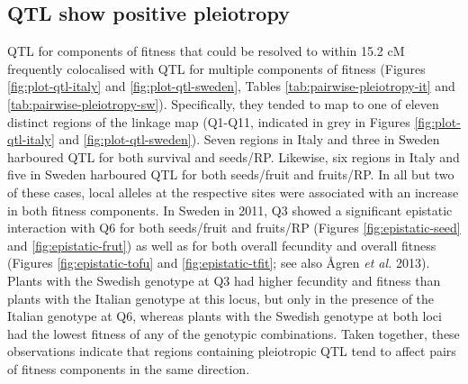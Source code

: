 \documentclass[]{article}
\begin{document}
\hypertarget{qtl-show-positive-pleiotropy}{%
\subsection{QTL show positive pleiotropy}\label{qtl-show-positive-pleiotropy}}

QTL for components of fitness that could be resolved to within 15.2 cM frequently colocalised with QTL for multiple components of fitness (Figures \ref{fig:plot-qtl-italy} and \ref{fig:plot-qtl-sweden}, Tables \ref{tab:pairwise-pleiotropy-it} and \ref{tab:pairwise-pleiotropy-sw}). Specifically, they tended to map to one of eleven distinct regions of the linkage map (Q1-Q11, indicated in grey in Figures \ref{fig:plot-qtl-italy} and \ref{fig:plot-qtl-sweden}).
Seven regions in Italy and three in Sweden harboured QTL for both survival and seeds/RP.
Likewise, six regions in Italy and five in Sweden harboured QTL for both seeds/fruit and fruits/RP. In all but two of these cases, local alleles at the respective sites were associated with an increase in both fitness components.
In Sweden in 2011, Q3 showed a significant epistatic interaction with Q6 for both seeds/fruit and fruits/RP (Figures \ref{fig:epistatic-seed} and \ref{fig:epistatic-frut}) as well as for both overall fecundity and overall fitness (Figures \ref{fig:epistatic-tofu} and \ref{fig:epistatic-tfit}; see also Ågren \emph{et al.} 2013). Plants with the Swedish genotype at Q3 had higher fecundity and fitness than plants with the Italian genotype at this locus, but only in the presence of the Italian genotype at Q6, whereas plants with the Swedish genotype at both loci had the lowest fitness of any of the genotypic combinations. Taken together, these observations indicate that regions containing pleiotropic QTL tend to affect pairs of fitness components in the same direction.
\end{document}
